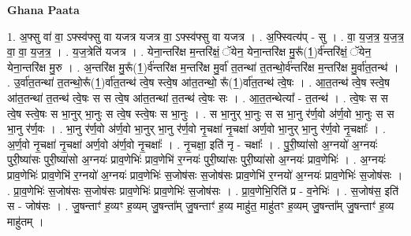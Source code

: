\documentclass[17pt]{extarticle}
\begin{document}
\textbf{Ghana Paata } \newline

1. अ॒फ्सु वा॑ वा॒ ऽफ्स्व॑फ्सु वा यजत्र यजत्र वा॒ ऽफ्स्व॑फ्सु वा यजत्र । . अ॒फ्स्वित्य॑प् - सु । . वा॒ य॒ज॒त्र॒ य॒ज॒त्र॒ वा॒ वा॒ य॒ज॒त्र॒ । . य॒ज॒त्रेति॑ यजत्र । . येना॒न्तरि॑क्ष म॒न्तरि॑क्षं॒ ॅयेन॒ येना॒न्तरि॑क्ष मु॒रू᳚(1॒)र्व॑न्तरि॑क्षं॒ ॅयेन॒ येना॒न्तरि॑क्ष मु॒रु । . अ॒न्तरि॑क्ष मु॒रू᳚(1॒)र्व॑न्तरि॑क्ष म॒न्तरि॑क्ष मु॒र्वा॑ त॒तन्था॑ त॒तन्थो॒र्व॑न्तरि॑क्ष म॒न्तरि॑क्ष मु॒र्वा॑त॒तन्थ॑ । . उ॒र्वा॑त॒तन्था॑ त॒तन्थो॒रू᳚(1॒)र्वा॑त॒तन्थ॑ त्वे॒ष स्त्वे॒ष आ॑त॒तन्थो॒ रू᳚(1॒)र्वा॑त॒तन्थ॑ त्वे॒षः । . आ॒त॒तन्थ॑ त्वे॒ष स्त्वे॒ष आ॑त॒तन्था॑ त॒तन्थ॑ त्वे॒षः स स त्वे॒ष आ॑त॒तन्था॑ त॒तन्थ॑ त्वे॒षः सः । . आ॒त॒तन्थेत्या᳚ - त॒तन्थ॑ । . त्वे॒षः स स त्वे॒ष स्त्वे॒षः स भा॒नुर् भा॒नुः स त्वे॒ष स्त्वे॒षः स भा॒नुः । . स भा॒नुर् भा॒नुः स स भा॒नु र॑र्ण॒वो अ॑र्ण॒वो भा॒नुः स स भा॒नु र॑र्ण॒वः । . भा॒नु र॑र्ण॒वो अ॑र्ण॒वो भा॒नुर् भा॒नु र॑र्ण॒वो नृ॒चक्षा॑ नृ॒चक्षा॑ अर्ण॒वो भा॒नुर् भा॒नु र॑र्ण॒वो नृ॒चक्षाः᳚ । . अ॒र्ण॒वो नृ॒चक्षा॑ नृ॒चक्षा॑ अर्ण॒वो अ॑र्ण॒वो नृ॒चक्षाः᳚ । . नृ॒चक्षा॒ इति॑ नृ - चक्षाः᳚ । . पु॒री॒ष्या॑सो अ॒ग्नयो॑ अ॒ग्नयः॑ पुरी॒ष्या॑सः पुरी॒ष्या॑सो अ॒ग्नयः॑ प्राव॒णेभिः॑ प्राव॒णेभि॑ र॒ग्नयः॑ पुरी॒ष्या॑सः पुरी॒ष्या॑सो अ॒ग्नयः॑ प्राव॒णेभिः॑ । . अ॒ग्नयः॑ प्राव॒णेभिः॑ प्राव॒णेभि॑ र॒ग्नयो॑ अ॒ग्नयः॑ प्राव॒णेभिः॑ स॒जोष॑सः स॒जोष॑सः प्राव॒णेभि॑ र॒ग्नयो॑ अ॒ग्नयः॑ प्राव॒णेभिः॑ स॒जोष॑सः । . प्रा॒व॒णेभिः॑ स॒जोष॑सः स॒जोष॑सः प्राव॒णेभिः॑ प्राव॒णेभिः॑ स॒जोष॑सः । . प्रा॒व॒णेभि॒रिति॑ प्र - व॒नेभिः॑ । . स॒जोष॑स॒ इति॑ स - जोष॑सः । . जु॒षन्ताꣳ॑ ह॒व्यꣳ ह॒व्यम् जु॒षन्ता᳚म् जु॒षन्ताꣳ॑ ह॒व्य माहु॑त॒ माहु॑तꣳ ह॒व्यम् जु॒षन्ता᳚म् जु॒षन्ताꣳ॑ ह॒व्य माहु॑तम् । \newline
\end{document}
